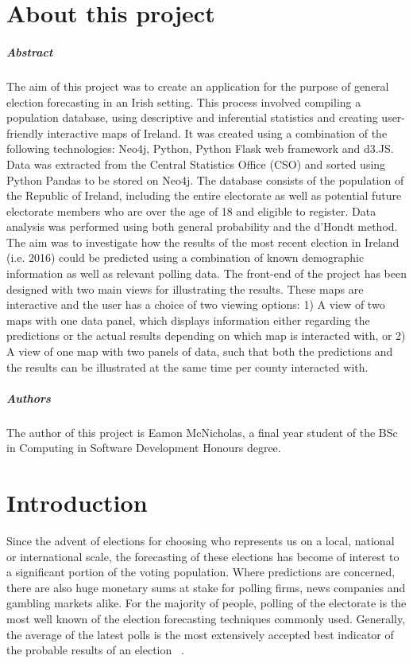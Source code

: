 
\chapter*{About this project}
\paragraph{Abstract}
The aim of this project was to create an application for the purpose of general election forecasting in an Irish setting. This process involved compiling a population database, using descriptive and inferential statistics and creating user-friendly interactive maps of Ireland. It was created using a 
combination of the following technologies: Neo4j, Python, Python Flask web framework and d3.JS. Data was extracted from the Central Statistics Office (CSO) and sorted using Python Pandas to be stored on Neo4j. The database consists of the population of the Republic of Ireland, including the entire electorate as well as potential future electorate members who are over the age of 18 and eligible to register. Data analysis was performed using both general probability and the d’Hondt method. The aim was to investigate how the results of the most recent election in Ireland (i.e. 2016) could be predicted using a combination of known demographic information as well as relevant polling data. The front-end of the project has been designed with two main views for illustrating the results. These maps are interactive and the user has a choice of two viewing options: 1) A view of two maps with one data panel, which displays information either regarding the predictions or the actual results depending on which map is interacted with, or 2) A view of one map with two panels of data, such that both the predictions and the results can be illustrated at the same time per county interacted with.

\paragraph{Authors}
The author of this project is Eamon McNicholas, a final year student of the BSc in Computing in Software Development Honours degree. 




\chapter{Introduction}

Since the advent of elections for choosing who represents us on a local, national or international scale, the forecasting of these elections has become of interest to a significant portion of the voting population. Where predictions are concerned, there are also huge monetary sums at stake for polling firms, news companies and gambling markets alike. For the majority of  people, polling of the electorate is the most well known of the election forecasting techniques commonly used. Generally,  the average of the latest polls is the most extensively accepted best indicator of the probable results of an election ~\cite{stegmaier}.

